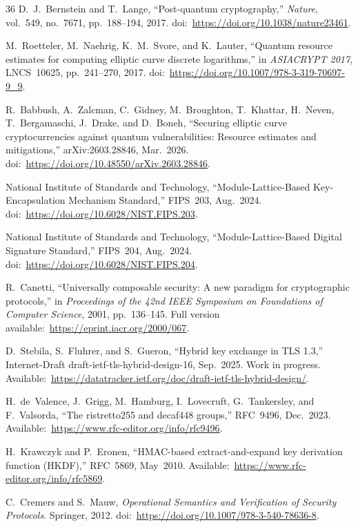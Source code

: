 \documentclass[conference]{IEEEtran}
\begin{document}
\begin{thebibliography}{36}
D.~J.~Bernstein and T.~Lange, ``Post-quantum cryptography,'' \emph{Nature}, vol.~549, no.~7671, pp.~188--194, 2017. doi:~\url{https://doi.org/10.1038/nature23461}.

M.~Roetteler, M.~Naehrig, K.~M.~Svore, and K.~Lauter, ``Quantum resource estimates for computing elliptic curve discrete logarithms,'' in \emph{ASIACRYPT 2017}, LNCS~10625, pp.~241--270, 2017. doi:~\url{https://doi.org/10.1007/978-3-319-70697-9_9}.

R.~Babbush, A.~Zalcman, C.~Gidney, M.~Broughton, T.~Khattar,
H.~Neven, T.~Bergamaschi, J.~Drake, and D.~Boneh,
``Securing elliptic curve cryptocurrencies against quantum vulnerabilities:
Resource estimates and mitigations,'' arXiv:2603.28846, Mar.~2026.
doi:~\url{https://doi.org/10.48550/arXiv.2603.28846}.

National Institute of Standards and Technology, ``Module-Lattice-Based Key-Encapsulation Mechanism Standard,'' FIPS~203, Aug.~2024. doi:~\url{https://doi.org/10.6028/NIST.FIPS.203}.

National Institute of Standards and Technology, ``Module-Lattice-Based Digital Signature Standard,'' FIPS~204, Aug.~2024. doi:~\url{https://doi.org/10.6028/NIST.FIPS.204}.

R.~Canetti, ``Universally composable security: A new paradigm for cryptographic protocols,'' in \emph{Proceedings of the 42nd IEEE Symposium on Foundations of Computer Science}, 2001, pp.~136--145. Full version available:~\url{https://eprint.iacr.org/2000/067}.

D.~Stebila, S.~Fluhrer, and S.~Gueron, ``Hybrid key exchange in TLS 1.3,'' Internet-Draft draft-ietf-tls-hybrid-design-16, Sep.~2025. Work in progress. Available:~\url{https://datatracker.ietf.org/doc/draft-ietf-tls-hybrid-design/}.

H.~de~Valence, J.~Grigg, M.~Hamburg, I.~Lovecruft, G.~Tankersley, and F.~Valsorda, ``The ristretto255 and decaf448 groups,'' RFC~9496, Dec.~2023. Available:~\url{https://www.rfc-editor.org/info/rfc9496}.

H.~Krawczyk and P.~Eronen, ``HMAC-based extract-and-expand key derivation function (HKDF),'' RFC~5869, May~2010. Available:~\url{https://www.rfc-editor.org/info/rfc5869}.

C.~Cremers and S.~Mauw, \emph{Operational Semantics and Verification of Security Protocols}. Springer, 2012. doi:~\url{https://doi.org/10.1007/978-3-540-78636-8}.


\end{thebibliography}
\end{document}
